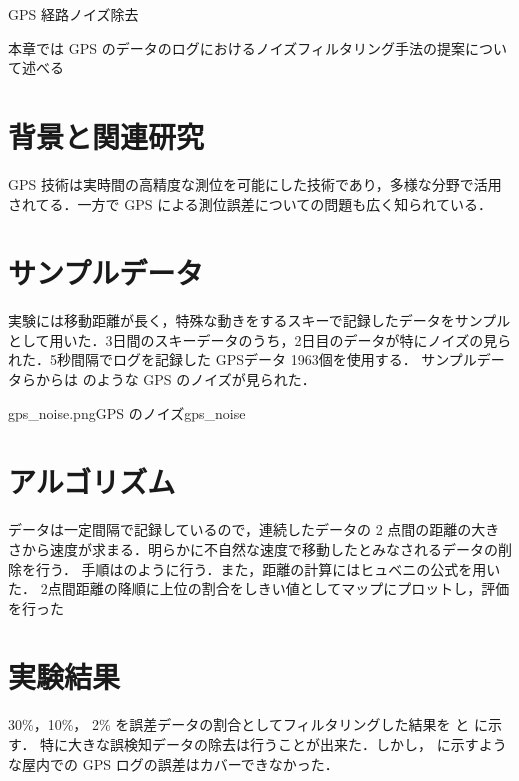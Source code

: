 \chapterhead
{GPS 経路ノイズ除去}

{本章では GPS のデータのログにおけるノイズフィルタリング手法の提案について述べる}



\section{背景と関連研究}
GPS 技術は実時間の高精度な測位を可能にした技術であり，多様な分野で活用されてる．一方で GPS による測位誤差についての問題も広く知られている\cite{gps_wrong}．

\section{サンプルデータ}
実験には移動距離が長く，特殊な動きをするスキーで記録したデータをサンプルとして用いた．3日間のスキーデータのうち，2日目のデータが特にノイズの見られた．5秒間隔でログを記録した GPSデータ 1963個を使用する．
サンプルデータらからは のような GPS のノイズが見られた．

%
{gps_noise.png}{GPS のノイズ}{gps_noise}









\section{アルゴリズム}
データは一定間隔で記録しているので，連続したデータの 2 点間の距離の大きさから速度が求まる．明らかに不自然な速度で移動したとみなされるデータの削除を行う．
手順はのように行う．また，距離の計算にはヒュベニの公式を用いた．
2点間距離の降順に上位の割合をしきい値としてマップにプロットし，評価を行った






\section{実験結果}
30\%，10\%， 2\% を誤差データの割合としてフィルタリングした結果を と  に示す．
特に大きな誤検知データの除去は行うことが出来た．しかし， に示すような屋内での GPS ログの誤差はカバーできなかった．

